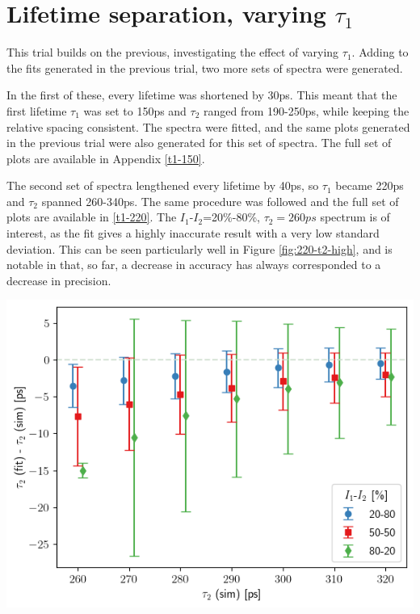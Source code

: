 \pagebreak

\section{Lifetime separation, varying $\tau_1$}

This trial builds on the previous, investigating the effect of varying $\tau_1$. Adding to the fits generated in the previous trial, two more sets of spectra were generated. 

In the first of these, every lifetime was shortened by 30ps. This meant that the first lifetime $\tau_1$ was set to 150ps and $\tau_2$ ranged from 190-250ps, while keeping the relative spacing consistent. The spectra were fitted, and the same plots generated in the previous trial were also generated for this set of spectra. The full set of plots are available in Appendix \ref{t1-150}.

The second set of spectra lengthened every lifetime by 40ps, so $\tau_1$ became 220ps and $\tau_2$ spanned 260-340ps. The same procedure was followed and the full set of plots are available in \ref{t1-220}. The $I_1$-$I_2$=20\%-80\%, $\tau_2=260ps$ spectrum is of interest, as the fit gives a highly inaccurate result with a very low standard deviation. This can be seen particularly well in Figure \ref{fig:220-t2-high}, and is notable in that, so far, a decrease in accuracy has always corresponded to a decrease in precision.

\vspace{0.5cm}

\begin{minipage}{.9\linewidth}
     
    \includegraphics[width=0.6\linewidth]{Batch 3/regular IRF/tau1 220/output/plotfin/t2.png}
    \label{fig:220-t2-high}
\end{minipage}

